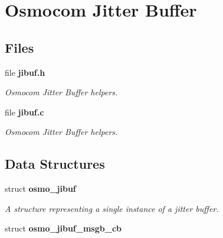 \section{Osmocom Jitter Buffer}
\label{group__jibuf}
\subsection*{Files}
\begin{DoxyCompactItemize}
\item 
file {\bf jibuf.\+h}
\begin{DoxyCompactList}\small\item\em Osmocom Jitter Buffer helpers. \end{DoxyCompactList}\item 
file {\bf jibuf.\+c}
\begin{DoxyCompactList}\small\item\em Osmocom Jitter Buffer helpers. \end{DoxyCompactList}\end{DoxyCompactItemize}
\subsection*{Data Structures}
\begin{DoxyCompactItemize}
\item 
struct {\bf osmo\+\_\+jibuf}
\begin{DoxyCompactList}\small\item\em A structure representing a single instance of a jitter buffer. \end{DoxyCompactList}\item 
struct {\bf osmo\+\_\+jibuf\+\_\+msgb\+\_\+cb}
\end{DoxyCompactItemize}
